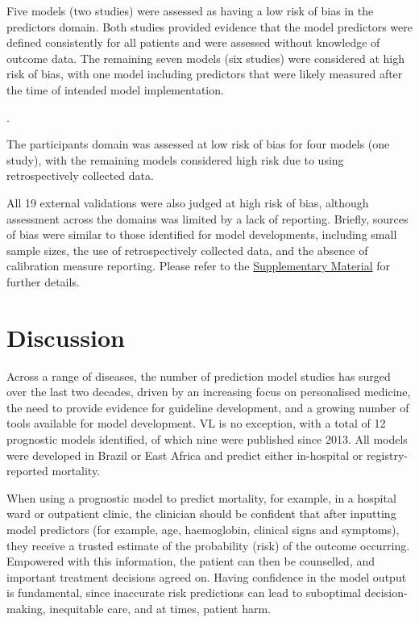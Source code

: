 Five models (two studies) were assessed as having a low risk of bias in the predictors domain\cite{abongomeraDevelopmentExternalValidation2017,costaPredictingDeathKalaazar2016}. Both studies provided evidence that the model predictors were defined consistently for all patients and were assessed without knowledge of outcome data. The remaining seven models (six studies) were considered at high risk of bias, with one model including predictors that were likely measured after the time of intended model implementation\cite{dearaujoEarlyClinicalManifestations2012}.

 \cite{coura-vitalPrognosticFactorsScoring2014,dearaujoEarlyClinicalManifestations2012}.

The participants domain was assessed at low risk of bias for four models (one study)\cite{costaPredictingDeathKalaazar2016}, with the remaining models considered high risk due to using retrospectively collected data.

All 19 external validations were also judged at high risk of bias, although assessment across the domains was limited by a lack of reporting. Briefly, sources of bias were similar to those identified for model developments, including small sample sizes, the use of retrospectively collected data, and the absence of calibration measure reporting. Please refer to the \href{https://github.com/jpwil/dphil}{Supplementary Material} for further details.

\section{Discussion}

Across a range of diseases, the number of prediction model studies has surged over the last two decades, driven by an increasing focus on personalised medicine, the need to provide evidence for guideline development, and a growing number of tools available for model development\cite{peetluk2021,collins2024A,wesslerClinicalPredictionModels2015}. VL is no exception, with a total of 12 prognostic models identified, of which nine were published since 2013. All models were developed in Brazil or East Africa and predict either in-hospital or registry-reported mortality.

When using a prognostic model to predict mortality, for example, in a hospital ward or outpatient clinic, the clinician should be confident that after inputting model predictors (for example, age, haemoglobin, clinical signs and symptoms), they receive a trusted estimate of the probability (risk) of the outcome occurring. Empowered with this information, the patient can then be counselled, and important treatment decisions agreed on. Having confidence in the model output is fundamental, since inaccurate risk predictions can lead to suboptimal decision-making, inequitable care, and at times, patient harm.


